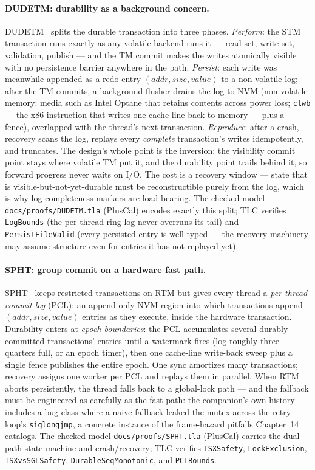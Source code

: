\paragraph{DUDETM: durability as a background concern.}
DUDETM~\cite{liu17dudetm} splits the durable transaction into three phases.
\emph{Perform}: the STM transaction runs exactly as any volatile backend runs
it --- read-set, write-set, validation, publish --- and the TM commit makes the
writes atomically visible with no persistence barrier anywhere in the path.
\emph{Persist}: each write was meanwhile appended as a redo entry
$(addr, size, value)$ to a non-volatile log; after the TM commits, a background
flusher drains the log to NVM (non-volatile memory: media such as Intel
Optane that retains contents across power loss; \texttt{clwb} --- the x86
instruction that writes one cache line back to memory --- plus a fence),
overlapped with the
thread's next transaction. \emph{Reproduce}: after a crash, recovery scans the
log, replays every \emph{complete} transaction's writes idempotently, and
truncates. The design's whole point is the inversion: the visibility commit
point stays where volatile TM put it, and the durability point trails behind
it, so forward progress never waits on I/O. The cost is a recovery window ---
state that is visible-but-not-yet-durable must be reconstructible purely from
the log, which is why log completeness markers are load-bearing. The checked
model \texttt{docs/proofs/DUDETM.tla} (PlusCal) encodes exactly this split;
TLC verifies \texttt{LogBounds} (the per-thread ring log never overruns its
tail) and \texttt{Persist\allowbreak FileValid} (every persisted entry is well-typed ---
the recovery machinery may assume structure even for entries it has not
replayed yet).

\paragraph{SPHT: group commit on a hardware fast path.}
SPHT~\cite{castro21spht} keeps restricted transactions on RTM but gives every
thread a \emph{per-thread commit log} (PCL): an append-only NVM region into
which transactions append $(addr, size, value)$ entries as they execute,
inside the hardware transaction. Durability enters at \emph{epoch boundaries}:
the PCL accumulates several durably-committed transactions' entries until a
watermark fires (log roughly three-quarters full, or an epoch timer), then one
cache-line write-back sweep plus a single fence publishes the entire epoch.
One sync amortizes many transactions; recovery assigns one worker per PCL and
replays them in parallel. When RTM aborts persistently, the thread falls back
to a global-lock path --- and the fallback must be engineered as carefully as
the fast path: the companion's own history includes a bug class where a naive
fallback leaked the mutex across the retry loop's \texttt{siglongjmp}, a
concrete instance of the frame-hazard pitfalls Chapter~14 catalogs. The
checked model \texttt{docs/proofs/SPHT.tla} (PlusCal) carries the dual-path
state machine and crash/recovery; TLC verifies \texttt{TSXSafety},
\texttt{LockExclusion}, \texttt{TSXvsSGLSafety},
\texttt{DurableSeqMonotonic}, and \texttt{PCLBounds}.

